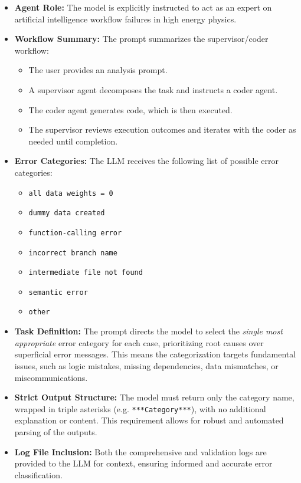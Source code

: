 \documentclass[aps,prd,reprint,superscriptaddress]{revtex4-2}
\begin{document}
\begin{itemize}
    \item \textbf{Agent Role:} The model is explicitly instructed to act as an expert on artificial intelligence workflow failures in high energy physics.
    \item \textbf{Workflow Summary:} The prompt summarizes the supervisor/coder workflow:
    \begin{itemize}
        \item The user provides an analysis prompt.
        \item A supervisor agent decomposes the task and instructs a coder agent.
        \item The coder agent generates code, which is then executed.
        \item The supervisor reviews execution outcomes and iterates with the coder as needed until completion.
    \end{itemize}
    \item \textbf{Error Categories:} The LLM receives the following list of possible error categories:
    \begin{itemize}
        \item \texttt{all data weights = 0}
        \item \texttt{dummy data created}
        \item \texttt{function-calling error}
        \item \texttt{incorrect branch name}
        \item \texttt{intermediate file not found}
        \item \texttt{semantic error}
        \item \texttt{other}
    \end{itemize}
    \item \textbf{Task Definition:} The prompt directs the model to select the \emph{single most appropriate} error category for each case, prioritizing root causes over superficial error messages. This means the categorization targets fundamental issues, such as logic mistakes, missing dependencies, data mismatches, or miscommunications. 
    \item \textbf{Strict Output Structure:} The model must return only the category name, wrapped in triple asterisks (e.g. \verb|***Category***|), with no additional explanation or content. This requirement allows for robust and automated parsing of the outputs.
    \item \textbf{Log File Inclusion:} Both the comprehensive and validation logs are provided to the LLM for context, ensuring informed and accurate error classification.
\end{itemize}
\end{document}
